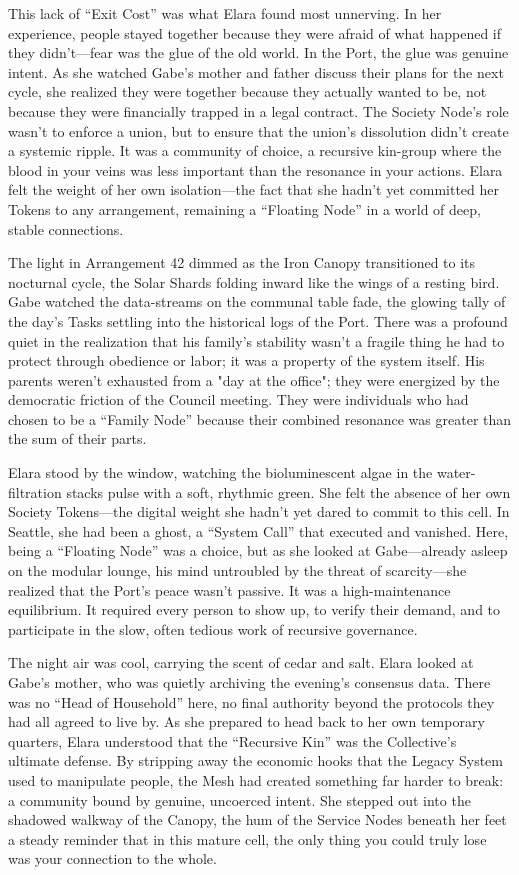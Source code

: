 This lack of ``Exit Cost'' was what Elara found most unnerving. In her experience, people stayed together because they were afraid of what happened if they didn't—fear was the glue of the old world. In the Port, the glue was genuine intent. As she watched Gabe's mother and father discuss their plans for the next cycle, she realized they were together because they actually wanted to be, not because they were financially trapped in a legal contract. The Society Node's role wasn't to enforce a union, but to ensure that the union's dissolution didn't create a systemic ripple. It was a community of choice, a recursive kin-group where the blood in your veins was less important than the resonance in your actions. Elara felt the weight of her own isolation—the fact that she hadn't yet committed her Tokens to any arrangement, remaining a ``Floating Node'' in a world of deep, stable connections.

The light in Arrangement 42 dimmed as the Iron Canopy transitioned to its nocturnal cycle, the Solar Shards folding inward like the wings of a resting bird. Gabe watched the data-streams on the communal table fade, the glowing tally of the day's Tasks settling into the historical logs of the Port. There was a profound quiet in the realization that his family's stability wasn't a fragile thing he had to protect through obedience or labor; it was a property of the system itself. His parents weren't exhausted from a "day at the office"; they were energized by the democratic friction of the Council meeting. They were individuals who had chosen to be a ``Family Node'' because their combined resonance was greater than the sum of their parts.

Elara stood by the window, watching the bioluminescent algae in the water-filtration stacks pulse with a soft, rhythmic green. She felt the absence of her own Society Tokens—the digital weight she hadn't yet dared to commit to this cell. In Seattle, she had been a ghost, a ``System Call'' that executed and vanished. Here, being a ``Floating Node'' was a choice, but as she looked at Gabe—already asleep on the modular lounge, his mind untroubled by the threat of scarcity—she realized that the Port's peace wasn't passive. It was a high-maintenance equilibrium. It required every person to show up, to verify their demand, and to participate in the slow, often tedious work of recursive governance.

The night air was cool, carrying the scent of cedar and salt. Elara looked at Gabe's mother, who was quietly archiving the evening's consensus data. There was no ``Head of Household'' here, no final authority beyond the protocols they had all agreed to live by. As she prepared to head back to her own temporary quarters, Elara understood that the ``Recursive Kin'' was the Collective's ultimate defense. By stripping away the economic hooks that the Legacy System used to manipulate people, the Mesh had created something far harder to break: a community bound by genuine, uncoerced intent. She stepped out into the shadowed walkway of the Canopy, the hum of the Service Nodes beneath her feet a steady reminder that in this mature cell, the only thing you could truly lose was your connection to the whole.
